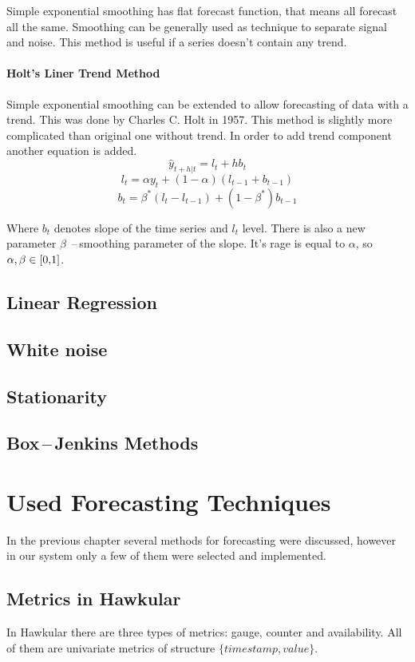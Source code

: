 Simple exponential smoothing has flat forecast function, that means all forecast
all the same. Smoothing can be generally used as technique to separate signal and noise.
This method is useful if a series doesn't contain any trend.

\subsubsection{Holt's Liner Trend Method}
Simple exponential smoothing can be extended to allow forecasting of data with a trend. 
This was done by Charles C. Holt in 1957. This method is slightly more complicated than 
original one without trend. In order to add trend component another equation is added. 
$$ \hat{y}_{t+h|t} = l_{t} + hb_{t} $$
$$ l_t = \alpha y_t + (1 - \alpha) (l_{t-1} + b_{t-1})$$
$$ b_t = \beta^{*} (l_t - l_{t-1}) + (1 - \beta^{*})b_{t-1} $$

Where $b_t$ denotes slope of the time series and $l_t$ level. There is also a new parameter $\beta$
\,--\,smoothing parameter of the slope. It's rage is equal to $\alpha$, so $\alpha,\beta
\in \interval[{0,1}]$. 
\section{Linear Regression}

\section{White noise}
\section{Stationarity}

\section{Box\,--\,Jenkins Methods}

\chapter{Used Forecasting Techniques}
In the previous chapter several methods for forecasting were discussed, however
in our system only a few of them were selected and implemented.

\section{Metrics in Hawkular}
In Hawkular there are three types of metrics: gauge, counter and availability. 
All of them are univariate metrics of structure $ \{timestamp, value\} $.

